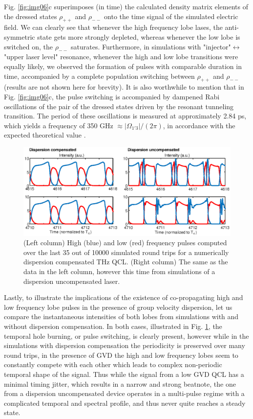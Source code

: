 \documentclass[10pt,letterpaper]{article}
\begin{document}
{Fig. \ref{fig:img06}c superimposes (in time) the calculated density matrix elements of the dressed states $\rho_{++}$ and $\rho_{--}$ onto the time signal of the simulated electric field. We can clearly see that whenever the high frequency lobe lases, the anti-symmetric state gets more strongly depleted, whereas whenever the low lobe is switched on, the $\rho_{--}$ saturates. Furthermore, in simulations with "injector"$\leftrightarrow$ "upper laser level" resonance, whenever the high and low lobe transitions were equally likely, we observed the formation of pulses with comparable duration in time, accompanied by a complete population switching between $\rho_{++}$ and $\rho_{--}$ (results are not shown here for brevity). It is also worthwhile to mention that in Fig. \ref{fig:img06}c, the pulse switching is accompanied by dampened Rabi oscillations of the pair of the dressed states driven by the resonant tunneling transition. The period of these oscillations is measured at approximately 2.84 ps, which yields a frequency of 350 GHz $\approx |\Omega_{1'3}|/(2\pi)$, in accordance with the expected theoretical value \cite{callebaut2005importance}. 
\begin{figure}[h!]
\begin{center}
\includegraphics[scale=.9 ]{figs/TEMPHOLEBURNING.eps}
\caption{(Left column) High (blue) and low (red) frequency pulses computed over the last 35 out of 10000 simulated round trips for a numerically dispersion compensated THz QCL. (Right column) The same as the data in the left column, however this time from simulations of a dispersion uncompensated laser.  } \label{fig:img07}
\end{center}	
\end{figure}

Lastly, to illustrate the implications of the existence of co-propagating high and low frequency lobe pulses in the presence of group velocity dispersion, let us compare the instantaneous intensities of both lobes from simulations with and without dispersion compensation. In both cases, illustrated in Fig. \ref{fig:img07}, the temporal hole burning, or pulse switching, is clearly present, however while in the simulations with dispersion compensation the periodicity is preserved over many round trips, in the presence of GVD the high and low frequency lobes seem to constantly compete with each other which leads to complex non-periodic temporal shape of the signal. Thus while the signal from a low GVD QCL has a minimal timing jitter, which results in a narrow and strong beatnote, the one from a dispersion uncompensated device operates in a multi-pulse regime with a complicated temporal and spectral profile, and thus never quite reaches a steady state.

}
\end{document}
